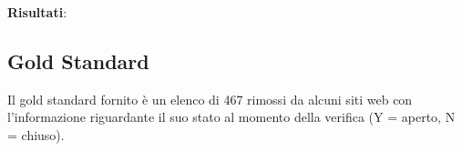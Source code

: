 \documentclass[a4paper,12pt]{article}
\begin{document}
\textbf{Risultati}: 

\subsection{Gold Standard}
Il gold standard fornito è un elenco di 467 rimossi da alcuni siti web con l'informazione riguardante il suo stato al momento della verifica (Y = aperto, N = chiuso). 




\newpage
\printbibliography[title=Bibliografia]
\end{document}
